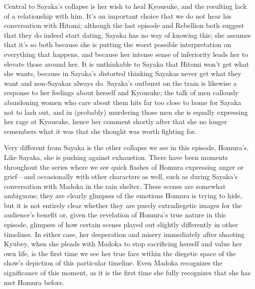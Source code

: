 Central to Sayaka's collapse is her wish to heal Kyousuke, and the resulting lack of a relationship with him. It's an important choice that we do not hear his conversation with Hitomi; although the last episode and Rebellion both suggest that they do indeed start dating, Sayaka has no way of knowing this; she assumes that it's so both because she is putting the worst possible interpretation on everything that happens, and because her intense sense of inferiority leads her to elevate those around her. It is unthinkable to Sayaka that Hitomi won't get what she wants, because in Sayaka's distorted thinking Sayakas never get what they want and non-Sayakas always do. Sayaka's outburst on the train is likewise a response to her feelings about herself and Kyousuke; the talk of men callously abandoning women who care about them hits far too close to home for Sayaka not to lash out, and in (probably) murdering those men she is equally expressing her rage at Kyousuke, hence her comment shortly after that she no longer remembers what it was that she thought was worth fighting for. 

Very different from Sayaka is the other collapse we see in this episode, Homura's. Like Sayaka, she is pushing against exhaustion. There have been moments throughout the series where we see quick flashes of Homura expressing anger or grief—and occasionally with other characters as well, such as during Sayaka's conversation with Madoka in the rain shelter. These scenes are somewhat ambiguous; they are clearly glimpses of the emotions Homura is trying to hide, but it is not entirely clear whether they are purely extradiegetic images for the audience's benefit or, given the revelation of Homura's true nature in this episode, glimpses of how certain scenes played out slightly differently in other timelines. In either case, her desperation and misery immediately after shooting Kyubey, when she pleads with Madoka to stop sacrificing herself and value her own life, is the first time we see her true face within the diegetic space of the show's depiction of this particular timeline. Even Madoka recognizes the significance of this moment, as it is the first time she fully recognizes that she has met Homura before.

